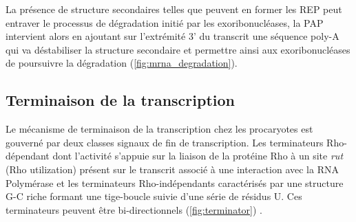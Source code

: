 \documentclass[12pt,a4paper]{report}
\begin{document}
\begin{onehalfspace}
La présence de structure secondaires telles que peuvent en former les REP peut entraver le processus de dégradation initié par les exoribonucléases, la PAP intervient alors en ajoutant sur l'extrémité 3' du transcrit une séquence poly-A qui va déstabiliser la structure secondaire et permettre ainsi aux exoribonucléases de poursuivre la dégradation (\autoref{fig:mrna_degradation}).

\subsection*{Terminaison de la transcription}
Le mécanisme de terminaison de la transcription chez les procaryotes est gouverné par deux classes signaux de fin de transcription. Les terminateurs Rho-dépendant dont l'activité s'appuie sur la liaison de la protéine Rho à un site \emph{rut} (Rho utilization) présent sur le transcrit associé à une interaction avec la RNA Polymérase et les terminateurs Rho-indépendants caractérisés par une structure G-C riche formant une tige-boucle suivie d'une série de résidus U. Ces terminateurs peuvent être bi-directionnels (\autoref{fig:terminator}) \citep{Henkin2000,Lesnik2001}.  

\begin{figure}
\end{figure}



\end{onehalfspace}
\end{document}
